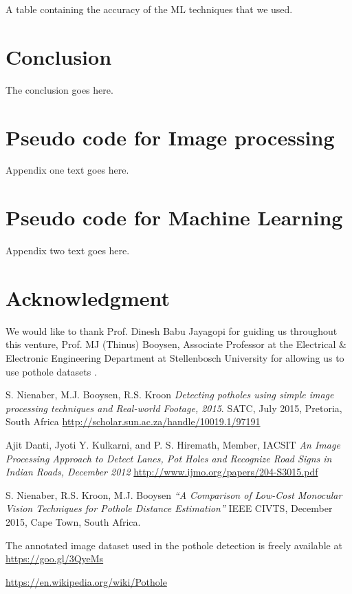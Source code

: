 \documentclass[journal]{IEEEtran}
\begin{document}
A table containing the accuracy of the ML techniques that we used.

\section{Conclusion}
The conclusion goes here.


\appendices
\section{Pseudo code for Image processing}
Appendix one text goes here.

\section{Pseudo code for Machine Learning}
Appendix two text goes here.


\section*{Acknowledgment}
We would like to thank Prof. Dinesh Babu Jayagopi for guiding us throughout this venture, Prof. MJ (Thinus) Booysen, Associate Professor at the Electrical $\&$ Electronic Engineering Department at Stellenbosch University for allowing us to use pothole datasets \cite{dataset}.


\ifCLASSOPTIONcaptionsoff
  \newpage
\fi

\begin{thebibliography}{1}

S. Nienaber, M.J. Booysen, R.S. Kroon
\textit{Detecting potholes using simple image processing techniques and Real-world Footage, 2015}. 
SATC, July 2015, Pretoria, South Africa
\url{http://scholar.sun.ac.za/handle/10019.1/97191}
 
Ajit Danti, Jyoti Y. Kulkarni, and P. S. Hiremath, Member, IACSIT
\textit{An Image Processing Approach to Detect Lanes, Pot Holes and Recognize Road Signs in Indian Roads, December 2012}
\url{http://www.ijmo.org/papers/204-S3015.pdf}

S. Nienaber, R.S. Kroon, M.J. Booysen  
\textit{“A Comparison of Low-Cost Monocular Vision Techniques for Pothole Distance Estimation”}
IEEE CIVTS, December 2015, Cape Town, South Africa.
 
The annotated image dataset used in the pothole detection is freely available at
\url{https://goo.gl/3QyeMs}

\url{https://en.wikipedia.org/wiki/Pothole}

\end{thebibliography}
\end{document}

